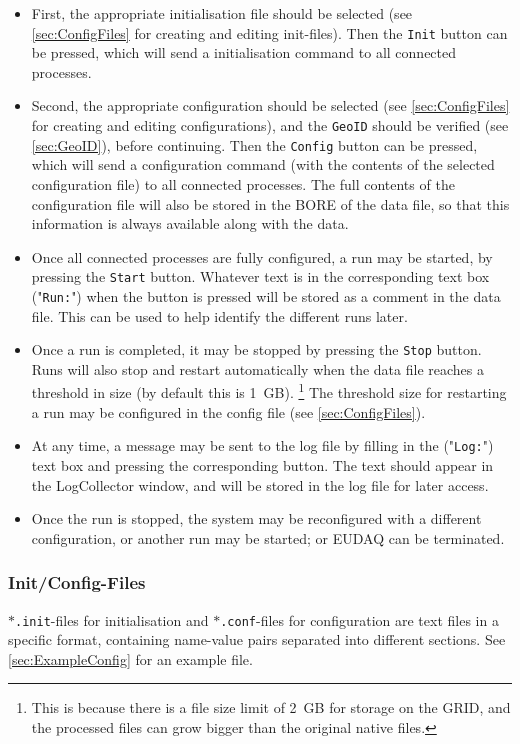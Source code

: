 \begin{itemize}
\item First, the appropriate initialisation file should be selected (see \autoref{sec:ConfigFiles} for creating and editing init-files). Then the \texttt{Init} button can be pressed,
which will send a initialisation command to all connected processes.

\item Second, the appropriate configuration should be selected 
(see \autoref{sec:ConfigFiles} for creating and editing configurations),
and the \texttt{GeoID} should be verified (see \autoref{sec:GeoID}), before continuing.
Then the \texttt{Config} button can be pressed,
which will send a configuration command
(with the contents of the selected configuration file) to all connected processes.
The full contents of the configuration file will also be stored
in the \gls{BORE} of the data file,
so that this information is always available along with the data.
\item Once all connected processes are fully configured, a run may be started, by pressing the \texttt{Start} button.
Whatever text is in the corresponding text box ("\texttt{Run:}") when the button is pressed
will be stored as a comment in the data file.
This can be used to help identify the different runs later.
\item Once a run is completed, it may be stopped by pressing the \texttt{Stop} button.
Runs will also stop and restart automatically when the data file reaches a threshold in size (by default this is 1~GB).%
\footnote{This is because there is a file size limit of 2~GB for storage on the GRID,
and the processed files can grow bigger than the original native files.}
The threshold size for restarting a run may be configured in the config file (see \autoref{sec:ConfigFiles}).
\item At any time, a message may be sent to the log file by filling in the ("\texttt{Log:}") text box and pressing the corresponding button.
The text should appear in the LogCollector window, and will be stored in the log file for later access.
\item Once the run is stopped, the system may be reconfigured with a different configuration, or another run may be started; or EUDAQ can be terminated.

\end{itemize}

\subsubsection{Init/Config-Files}\label{sec:ConfigFiles}
\texttt{$\ast$.init}-files for initialisation and \texttt{$\ast$.conf}-files for configuration
are text files in a specific format, containing name-value pairs separated into different sections.
See \autoref{sec:ExampleConfig} for an example file.

